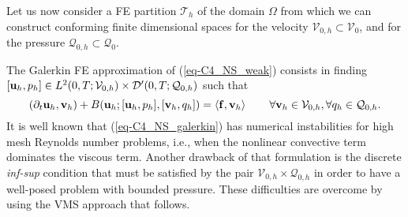 Let us now consider a FE partition $\mathcal{T}_h$ of the domain $\Omega$ from which we can construct conforming finite dimensional spaces for the velocity $\mathcal{V}_{0,h} \subset \mathcal{V}_0$, and for the pressure $\mathcal{Q}_{0,h}\subset \mathcal{Q}_0$. 

The Galerkin FE approximation of (\ref{eq-C4_NS_weak}) consists in finding $[{\bf u}_h,p_h]\in {L}^2(0,T;\mathcal{V}_{0,h})\times {\cal D}'(0,T;\mathcal{Q}_{0,h})$ such that
\begin{equation}
\label{eq-C4_NS_galerkin}
(\partial_t{\bf u}_h,{\bf v}_h) + B({\bf u}_h;[{\bf u}_h,p_h],[{\bf v}_h,q_h]) =\left<{\bf f},{\bf v}_h\right>
\quad\quad\forall{\bf v}_h\in\mathcal{V}_{0,h},\forall q_h\in\mathcal{Q}_{0,h}.
\end{equation}
It is well known that (\ref{eq-C4_NS_galerkin}) has numerical instabilities for high mesh Reynolds number problems, i.e., when the nonlinear convective term dominates the viscous term. Another drawback of that formulation is the discrete \textit{inf-sup} condition that must be satisfied by the pair $\mathcal{V}_{0,h} \times\mathcal{Q}_{0,h}$ in order to have a well-posed problem with bounded pressure. These difficulties are overcome by using the VMS approach that follows.

